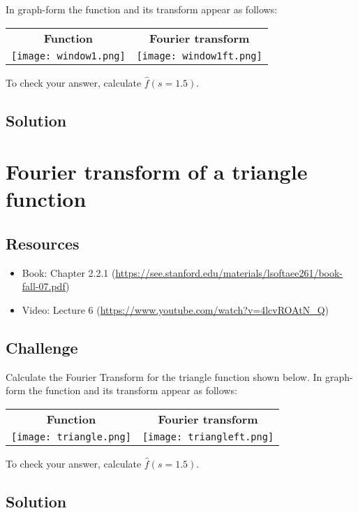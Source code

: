 In graph-form the function and its transform appear as follows:

\begin{tabular}{cc}
    \textbf{Function} & \textbf{Fourier transform} \\
    \texttt{[image: window1.png]} & \texttt{[image: window1ft.png]}
\end{tabular}

To check your answer, calculate $\hat{f}(s=1.5)$.

\subsection*{Solution}




\newpage
\section{Fourier transform of a triangle function}
\label{sec:ft_triangle}

\subsection*{Resources}
\begin{itemize}
    \item Book: Chapter 2.2.1 (\url{https://see.stanford.edu/materials/lsoftaee261/book-fall-07.pdf})
    \item Video: Lecture 6 (\url{https://www.youtube.com/watch?v=4lcvROAtN_Q})
\end{itemize}

\subsection*{Challenge}
Calculate the Fourier Transform for the triangle function shown below. In graph-form the function and its transform appear as follows:

\begin{tabular}{cc}
    \textbf{Function} & \textbf{Fourier transform} \\
    \texttt{[image: triangle.png]} & \texttt{[image: triangleft.png]}
\end{tabular}

To check your answer, calculate $\hat{f}(s=1.5)$.

\subsection*{Solution}




